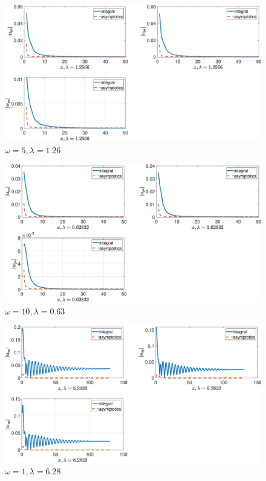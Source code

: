 \begin{figure}[!h]\centering\includegraphics[scale=0.38]{upsw5cp(1)1cp(2)2cs(1)0,3cs(20,5rho(1)1rho(2)2.eps}\caption{$ \omega = 5, \lambda=1.26$}\end{figure}

\begin{figure}[!h]\centering\includegraphics[scale=0.38]{upsw10cp(1)1cp(2)2cs(1)0,3cs(20,5rho(1)1rho(2)2.eps}\caption{$ \omega = 10, \lambda=0.63$}\end{figure}

\begin{figure}[!h]\centering\includegraphics[scale=0.38]{uspw1cp(1)1cp(2)2cs(1)0,3cs(20,5rho(1)1rho(2)2.eps}\caption{$ \omega = 1, \lambda=6.28$}\end{figure}

